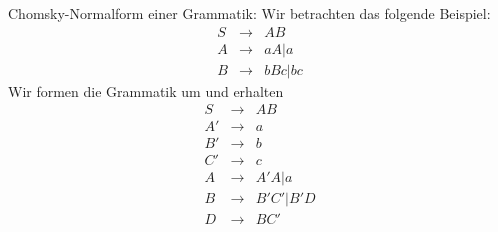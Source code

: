 \example Chomsky-Normalform einer Grammatik:{
  Wir betrachten das folgende Beispiel:
  \begin{eqnarray*}
    S & \to & AB\\
    A & \to & aA | a\\
    B & \to & bBc | bc
   \end{eqnarray*}
  Wir formen die Grammatik um und erhalten
  \begin{eqnarray*}
    S & \to & AB\\
    A' & \to & a\\
    B' & \to & b\\
    C' & \to & c\\
    A & \to & A'A | a\\
    B & \to & B'C' | B'D\\
    D & \to & BC'
    \end{eqnarray*}
  }
